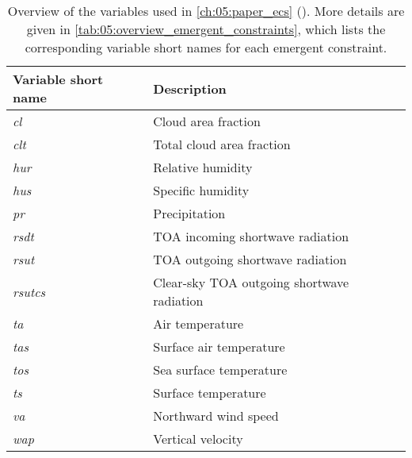 \begin{table}[!b]
  \centering
  \begin{tabulary}{\columnwidth}{L L}
    \toprule
    Variable short name & Description \\
    \midrule
    \emph{cl} & Cloud area fraction \\
    \emph{clt} & Total cloud area fraction \\
    \emph{hur} & Relative humidity \\
    \emph{hus} & Specific humidity \\
    \emph{pr} & Precipitation \\
    \emph{rsdt} & \Acf{TOA} incoming shortwave radiation \\
    \emph{rsut} & \acs{TOA} outgoing shortwave radiation \\
    \emph{rsutcs} & Clear-sky \acs{TOA} outgoing shortwave radiation \\
    \emph{ta} & Air temperature \\
    \emph{tas} & Surface air temperature \\
    \emph{tos} & Sea surface temperature \\
    \emph{ts} & Surface temperature \\
    \emph{va} & Northward wind speed \\
    \emph{wap} & Vertical velocity \\
    \bottomrule
  \end{tabulary}
  \caption{Overview of the variables used in \cref{ch:05:paper_ecs}
    (). More details are given in
    \cref{tab:05:overview_emergent_constraints}, which lists the corresponding
    variable short names for each emergent constraint.}
  \label{tab:app:a:overview_variables}
\end{table}

